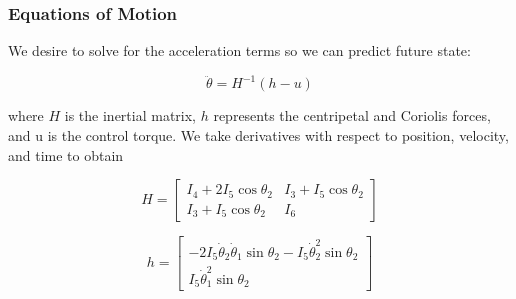 \documentclass{beamer}
\begin{document}

\begin{frame}
\frametitle{Equations of Motion}

We desire to solve for the
acceleration terms so we can predict future state:

\begin{equation}
	\ddot\theta = H^{-1} (h - u)
\end{equation}

where $H$ is the inertial matrix, $h$ represents the centripetal and Coriolis forces, and u
is the control torque. We take derivatives with respect to position, velocity, and time to obtain

\begin{equation}
	 H = 
	 \begin{bmatrix}
       I_4 + 2I_5\cos\theta_2 & I_3 + I_5\cos\theta_2           \\[0.3em]
       I_3+I_5\cos\theta_2 & I_6           
     \end{bmatrix}
\end{equation}

\begin{equation}
	h = 
	\begin{bmatrix}
		-2I_5\dot\theta_2\dot\theta_1\sin\theta_2-I_5\dot\theta_2^2\sin\theta_2 \\[0.3em]
		I_5\dot\theta_1^2\sin\theta_2
	\end{bmatrix}
\end{equation}

\end{frame}

\end{document}
